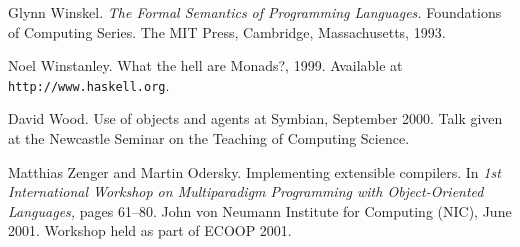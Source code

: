 \begin{thebibliography}{213}
Glynn Winskel. \emph{The Formal Semantics of Programming Languages.} Foundations of Computing Series. The MIT Press, Cambridge, Massachusetts, 1993.

Noel Winstanley. What the hell are Monads?, 1999. Available at \verb"http://www.haskell.org".

David Wood. Use of objects and agents at Symbian, September 2000. Talk given at the Newcastle Seminar on the Teaching of Computing Science.

Matthias Zenger and Martin Odersky. Implementing extensible compilers. In \emph{1st International Workshop on Multiparadigm Programming with Object-Oriented Languages,} pages 61–80. John von Neumann Institute for Computing (NIC), June 2001. Workshop held as part of ECOOP 2001.

\end{thebibliography}
